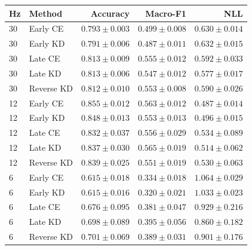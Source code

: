\begin{tabular}{llrrr}
\toprule
Hz & Method & Accuracy & Macro-F1 & NLL \\
\midrule
30 & Early CE & $0.793\pm0.003$ & $0.499\pm0.008$ & $0.630\pm0.014$ \\
30 & Early KD & $0.791\pm0.006$ & $0.487\pm0.011$ & $0.632\pm0.015$ \\
30 & Late CE & $0.813\pm0.009$ & $0.555\pm0.012$ & $0.592\pm0.033$ \\
30 & Late KD & $0.813\pm0.006$ & $0.547\pm0.012$ & $0.577\pm0.017$ \\
30 & Reverse KD & $0.812\pm0.010$ & $0.553\pm0.008$ & $0.590\pm0.026$ \\
12 & Early CE & $0.855\pm0.012$ & $0.563\pm0.012$ & $0.487\pm0.014$ \\
12 & Early KD & $0.848\pm0.013$ & $0.553\pm0.013$ & $0.496\pm0.015$ \\
12 & Late CE & $0.832\pm0.037$ & $0.556\pm0.029$ & $0.534\pm0.089$ \\
12 & Late KD & $0.837\pm0.030$ & $0.565\pm0.019$ & $0.514\pm0.062$ \\
12 & Reverse KD & $0.839\pm0.025$ & $0.551\pm0.019$ & $0.530\pm0.063$ \\
6 & Early CE & $0.615\pm0.018$ & $0.334\pm0.018$ & $1.064\pm0.029$ \\
6 & Early KD & $0.615\pm0.016$ & $0.320\pm0.021$ & $1.033\pm0.023$ \\
6 & Late CE & $0.676\pm0.095$ & $0.381\pm0.047$ & $0.929\pm0.216$ \\
6 & Late KD & $0.698\pm0.089$ & $0.395\pm0.056$ & $0.860\pm0.182$ \\
6 & Reverse KD & $0.701\pm0.069$ & $0.389\pm0.031$ & $0.901\pm0.176$ \\
\bottomrule
\end{tabular}
